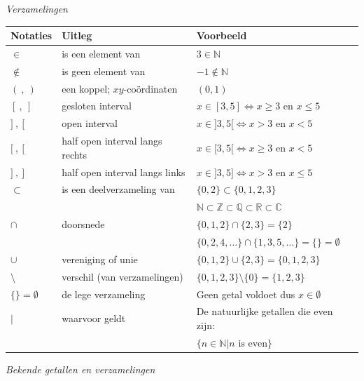 \emph{Verzamelingen}

\begin{center}
	\begin{tabular}{lll}
		Notaties & Uitleg & Voorbeeld \\
		\hline
		$\in$ & is een element van & $3 \in \mathbb{N}$ \\
		$\notin$ & is geen element van & $-1 \notin \mathbb{N}$ \\
		$(\ ,\ )$ & een koppel; $xy$-co\"ordinaten & $(0,1)$ \\
		$[\ ,\ ]$ & gesloten interval & $x \in [3,5]\iff x\ge 3 \text{ en } x \le 5$\\
		$]\ ,\ [$ & open interval & $x \in ]3,5[\iff x> 3 \text{ en } x < 5$\\
		$[\ ,\ [$ & half open interval langs rechts & $x \in [3,5[\iff x\ge 3 \text{ en } x < 5$\\
		$]\ ,\ ]$ & half open interval langs links & $x \in ]3,5]\iff x> 3 \text{ en } x \le 5$\\
		$\subset$ & is een deelverzameling van & $\{0,2\} \subset \{0,1,2,3\}$ \\
		& & $\mathbb{N} \subset \mathbb{Z} \subset \mathbb{Q} \subset \mathbb{R} \subset \mathbb{C}$ \\
		$\cap$ & doorsnede & $\{0,1,2\} \cap \{2,3\} = \{2\}$\\
		& & $\{0,2,4,\ldots\}\cap\{1,3,5,\ldots\}=\{\}=\emptyset$\\
		$\cup$ & vereniging of unie & $\{0,1,2\}\cup \{2,3\} = \{0,1,2,3\}$\\
		$\setminus$ & verschil (van verzamelingen) & $\{0,1,2,3\} \setminus \{0\} = \{1,2,3\}$ \\
		$\{\}=\emptyset$ & de lege verzameling & Geen getal voldoet dus $x \in \emptyset$ \\
		$|$ & waarvoor geldt & De natuurlijke getallen die even zijn: \\
		& & $\{n \in \mathbb{N} | n \text{ is even}\}$
	\end{tabular}
\end{center}

\emph{Bekende getallen en verzamelingen}

